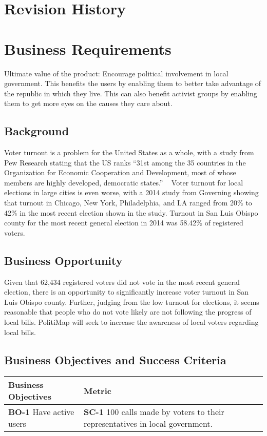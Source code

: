 \section{Revision History}
\section{Business Requirements}
Ultimate value of the product: Encourage political involvement in
local government. This benefits the users by enabling them to better
take advantage of the republic in which they live. This can also
benefit activist groups by enabling them to get more eyes on the
causes they care about.

\subsection{Background}
Voter turnout is a problem for the United States as a whole, with a
study from Pew Research stating that the US ranks “31st among the 35
countries in the Organization for Economic Cooperation and
Development, most of whose members are highly developed, democratic
states.”  \cite{pew} Voter turnout for local elections in large cities
is even worse, with a 2014 study from Governing showing that turnout
in Chicago, New York, Philadelphia, and LA ranged from 20\% to 42\% in
the most recent election shown in the study. \cite{governing} Turnout
in San Luis Obispo county for the most recent general election in 2014
was 58.42\% of registered voters. \cite{slocounty}

\subsection{Business Opportunity}
Given that 62,434 registered voters did not vote in the most recent
general election, there is an opportunity to significantly increase
voter turnout in San Luis Obispo county. Further, judging from the low
turnout for elections, it seems reasonable that people who do not vote
likely are not following the progress of local bills. PolitiMap will
seek to increase the awareness of local voters regarding local bills.

\subsection{Business Objectives and Success Criteria}
\begin{tabu}{lX}
  \toprule
  Business Objectives & Metric\\
  \midrule
  \textbf{BO-1} Have active users & \textbf{SC-1} 100 calls made by
  voters to their representatives in local government.\\
  \bottomrule
\end{tabu}

